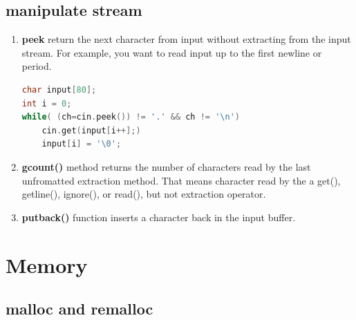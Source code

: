 \documentclass[a4paper,12pt,twoside]{book}
\begin{document}
\section{manipulate stream}
\begin{enumerate}
	\item \textbf{peek} return the next character from input without extracting from the input stream. For example, you want to read input up to the first newline or period.
\begin{lstlisting}[frame=single, language=c++]
char input[80];
int i = 0;
while( (ch=cin.peek()) != '.' && ch != '\n')
	cin.get(input[i++];)
	input[i] = '\0';
\end{lstlisting}
	
	\item \textbf{gcount()} method returns the number of characters read by the last unfromatted extraction method. That means character read by the a get(), getline(), ignore(), or read(), but not extraction operator.
	
	\item \textbf{putback()} function inserts a character back in the input buffer.
\end{enumerate}



\chapter{Memory}

\section{malloc and remalloc}
\end{document}
